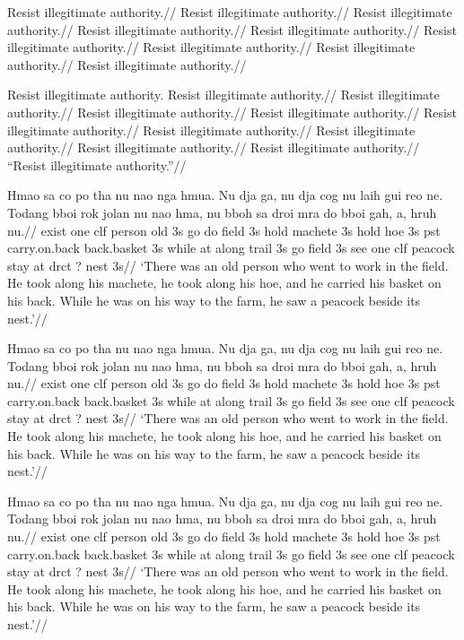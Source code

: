\documentclass[12pt]{article}
\begin{document}
\ex
\begingl[everyglword=\offinterlineskip]
\gla Resist illegitimate authority.//
\glb Resist illegitimate authority.//
\glc Resist illegitimate authority.//
\gld Resist illegitimate authority.//
\gle Resist illegitimate authority.//
\gld Resist illegitimate authority.//
\glc Resist illegitimate authority.//
\glb Resist illegitimate authority.//
\glf Resist illegitimate authority.//
\endgl
\xe

\ex[everyglword={\baselineskip=0pt \lineskip=.5ex},
   belowglpreambleskip=-.5ex]
\begingl
Resist illegitimate authority.
\gla Resist illegitimate authority.//
\glb Resist illegitimate authority.//
\glc Resist illegitimate authority.//
\gld Resist illegitimate authority.//
\gle Resist illegitimate authority.//
\gld Resist illegitimate authority.//
\glc Resist illegitimate authority.//
\glb Resist illegitimate authority.//
\glf Resist illegitimate authority.//
\glft ``Resist illegitimate authority.''//
\endgl
\xe

\endgroup

\ex[glhangstyle=cascade]
\begingl
\gla
Hmao sa co po tha  nu nao nga hmua. Nu dja ga, nu dja cog nu laih
gui reo ne. Todang bboi rok jolan nu nao hma, nu bboh sa droi mra
do bboi gah, a, hruh nu.//
\glb
exist one {clf} person old 3s go do field 3s hold machete 3s hold
hoe 3s pst carry.on.back back.basket 3s while at {along} trail 3s
go field 3s see one clf peacock stay at drct {?} nest 3s//
\glft
`There was an old person who went to work in the field. He took
along his machete, he took along his hoe, and he carried his
basket on his back. While he was on his way to the farm, he saw a
peacock beside its nest.'//
\endgl
\xe

\ex[glftpos=right,glhangstyle=none]
\begingl
\gla
Hmao sa co po tha  nu nao nga hmua. Nu dja ga, nu dja cog nu laih
gui reo ne. Todang bboi rok jolan nu nao hma, nu bboh sa droi mra
do bboi gah, a, hruh nu.//
\glb
exist one {clf} person old 3s go do field 3s hold machete 3s hold
hoe 3s pst carry.on.back back.basket 3s while at {along} trail 3s
go field 3s see one clf peacock stay at drct {?} nest 3s//
\glft
`There was an old person who went to work in the field. He took
along his machete, he took along his hoe, and he carried his
basket on his back. While he was on his way to the farm, he saw a
peacock beside its nest.'//
\endgl
\xe

\ex[glftpos=right,glhangstyle=none,ssrightskip=0pt plus 1.5em]
\begingl
\gla
Hmao sa co po tha  nu nao nga hmua. Nu dja ga, nu dja cog nu laih
gui reo ne. Todang bboi rok jolan nu nao hma, nu bboh sa droi mra
do bboi gah, a, hruh nu.//
\glb
exist one {clf} person old 3s go do field 3s hold machete 3s hold
hoe 3s pst carry.on.back back.basket 3s while at {along} trail 3s
go field 3s see one clf peacock stay at drct {?} nest 3s//
\glft
`There was an old person who went to work in the field. He took
along his machete, he took along his hoe, and he carried his
basket on his back. While he was on his way to the farm, he saw a
peacock beside its nest.'//
\endgl
\xe
\end{document}
